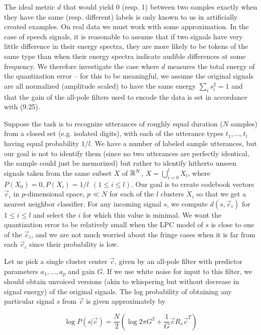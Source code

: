 The ideal metric $d$ that would yield 0 (resp. 1) between two samples exactly
when they have the same (resp. different) labels is only known to us in
artificially created examples. On real data we must work with some
approximation. In the case of speech signals, it is reasonable to assume that
if two signals have very little difference in their energy spectra, they are
more likely to be tokens of the same type than when their energy spectra
indicate audible differences at some frequency. We therefore investigate the
case where $d$ measures the total energy of the quantization error -- for this
to be meaningful, we assume the original signals are all normalized (amplitude
scaled) to have the same energy $\sum_i s_i^2 = 1$ and that the gain of the
all-pole filters used to encode the data is set in accordance with (9.25). 

Suppose the task is to recognize utterances of roughly equal duration ($N$
samples) from a closed set (e.g. isolated digits), with each of the utterance
types $t_1,\ldots,t_l$ having equal probability $1/l$. We have a number of
labeled sample utterances, but our goal is not to identify them (since no two
utterances are perfectly identical, the sample could just be memorized) but
rather to identify hitherto unseen signals taken from the same subset $X$ of
${\Bbb R}^N$, $X=\bigcup_{i=0}^l X_l$, where $P(X_0)=0, P(X_i)=1/l \ \ (1 \leq
i \leq l)$.  Our goal is to create codebook vectors $\vec{c}_i$ in
$p$-dimensional space, $p \ll N$ for each of the $l$ clusters $X_i$ so that we
get a nearest neighbor classifier. For any incoming signal $s$, we compute
$d(s,\vec{c}_i)$ for $1 \leq i \leq l$ and select the $i$ for which this
value is minimal. We want the quantization error to be relatively small when
the LPC model of $s$ is close to one of the $\vec{c}_i$, and we are not much
worried about the fringe cases when it is far from each $\vec{c}_i$ since
their probability is low.

Let us pick a single cluster center $\vec{c}$, given by an all-pole filter
with predictor parameters $a_1,\ldots,a_p$ and gain $G$. If we use white noise
for input to this filter, we should obtain unvoiced versions (akin to
whispering but without decrease in signal energy) of the original signals. 
The log probability of obtaining any particular signal $s$ from $\vec{c}$ is 
given approximately by 

\begin{equation}
\log P(s|\vec{c})=\frac{N}{2}\left(\log2\pi G^2 + \frac{1}{G}\vec{c}R_s\vec{c}^T\right)
\end{equation}

